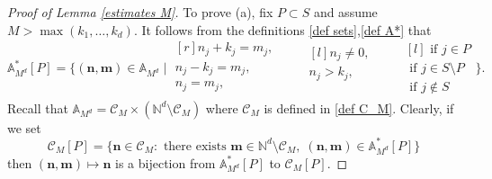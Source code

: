 \documentclass[a4paper,11pt]{article}
\numberwithin{equation}{section}
\theoremstyle{definition}
\newcommand{\eq}{\begin{equation}}
\newcommand{\qe}{\end{equation}}
\newcommand{\N}{\mathbb{N}}
\newcommand{\bs}{\boldsymbol}
\begin{document}
\begin{proof}[Proof of Lemma \ref{estimates M}] To prove (a), fix $P\subset S$ and assume $M>\max(k_1,\ldots,k_d)$. It follows from the definitions \eqref{def sets},\eqref{def A*} that
\eq
\label{A* easy}
\mathbb A_{M^d}^*[P]= \Bigg\{(\bs n,\bs m)\in\mathbb A_{M^d} \;\Bigg| \;
\begin{matrix*}[r]
n_j+k_j=m_j, \\
n_j-k_j=m_j, \\
n_j=m_j,\\
\end{matrix*}
\qquad
\begin{matrix*}[l]
n_j\neq 0, \\
n_j > k_j, \\
\\
\end{matrix*}
\qquad
\begin{matrix*}[l]
\mbox{ if } j\in P\\
\mbox{ if } j\in S\setminus P\\
\mbox{ if } j\notin S
\end{matrix*}
\Bigg\}.
\qe
Recall that  $\mathbb A_{M^d}=\mathcal C_M\times (\N^d\setminus\mathcal C_M)$
where $\mathcal C_M$ is defined in \eqref{def C_M}. Clearly, if we set
\eq
\label{def C_M[P_+]}
\mathcal C_M[P]=\Big\{\bs n\in\mathcal C_M : \mbox{ there exists $\bs m\in\N^d\setminus\mathcal C_M$}, \;(\bs n,\bs m)\in \mathbb A_{M^d}^*[P]\Big\}
\qe
then $(\bs n,\bs m)\mapsto \bs n$ is a bijection from $ \mathbb A_{M^d}^*[P]$ to $\mathcal C_M[P]$.


\end{proof}
\end{document}
